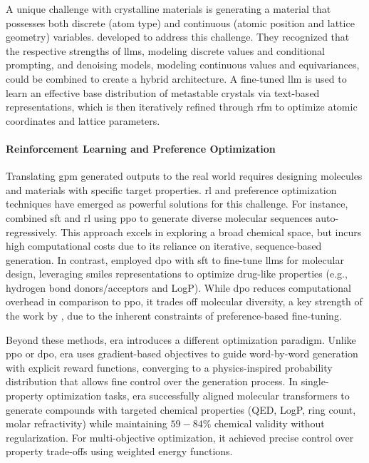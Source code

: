 A unique challenge with crystalline materials is generating a material that possesses both discrete (atom type) and continuous (atomic position and lattice geometry) variables. \textcite{sriram2024flowllm} developed  to address this challenge. They recognized that the respective strengths of \glspl{llm}, modeling discrete values and conditional prompting, and denoising models, modeling continuous values and equivariances, could be combined to create a hybrid architecture. 
A fine-tuned \gls{llm} is used to learn an effective base distribution of metastable crystals via text-based representations, which is then iteratively refined through \gls{rfm} to optimize atomic coordinates and lattice parameters.\autocite{sriram2024flowllm}

\paragraph{Reinforcement Learning and Preference Optimization}

Translating \gls{gpm} generated outputs to the real world requires designing molecules and materials with specific target properties. \gls{rl} and preference optimization techniques\autocite{lee2024fine-tuning} have emerged as powerful solutions for this challenge. For instance, \textcite{jang2025can} combined \gls{sft} and \gls{rl} using \gls{ppo} to generate diverse molecular sequences auto-regressively. 
This approach excels in exploring a broad chemical space, but incurs high computational costs due to its reliance on iterative, sequence-based generation. 
In contrast, \textcite{cavanagh2024smileyllama} employed \gls{dpo} with \gls{sft} to fine-tune \glspl{llm} for molecular design, leveraging \gls{smiles} representations to optimize drug-like properties (e.g., hydrogen bond donors/acceptors and LogP).
While \gls{dpo} reduces computational overhead in comparison to \gls{ppo}, it trades off molecular diversity, a key strength of the work by \textcite{jang2025can}, due to the inherent constraints of preference-based fine-tuning.

Beyond these methods, \gls{era} introduces a different optimization paradigm. \autocite{chennakesavalu2025aligning} Unlike \gls{ppo} or \gls{dpo}, \gls{era} uses gradient-based objectives to guide word-by-word generation with explicit reward functions, converging to a physics-inspired probability distribution that allows fine control over the generation process. 
In single-property optimization tasks, \gls{era} successfully aligned molecular transformers to generate compounds with targeted chemical properties (QED, LogP, ring count, molar refractivity) while maintaining $59-84\%$ chemical validity without regularization. For multi-objective optimization, it achieved precise control over property trade-offs using weighted energy functions.

